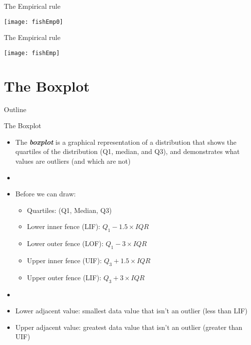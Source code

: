 \documentclass[xcolor=dvipsnames]{beamer}
\begin{document}
\begin{frame}{The Empirical rule}
	\begin{center}
		\texttt{[image: fishEmp0]}
	\end{center}
\end{frame}

\begin{frame}{The Empirical rule}
	\begin{center}
		\texttt{[image: fishEmp]}
	\end{center}
\end{frame}

\section{The Boxplot}
\begin{frame}{Outline}
	\tableofcontents[currentsection,subsectionstyle=show/shaded/hide]
\end{frame}

\begin{frame}{The Boxplot}
	\begin{itemize}
		\item The \textbf{\emph{boxplot}} is a graphical representation of a distribution that shows the quartiles of the distribution (Q1, median, and Q3), and demonstrates what values are outliers (and which are not)
		\item[] 
		\item Before we can draw:
		\begin{itemize}
			\item Quartiles: (Q1, Median, Q3)
			\item Lower inner fence (LIF): $Q_1 - 1.5 \times IQR$
			\item Lower outer fence (LOF): $Q_1 - 3 \times IQR$
			\item Upper inner fence (UIF): $Q_3 + 1.5 \times IQR$
			\item Upper outer fence (LIF): $Q_3 + 3 \times IQR$
		\end{itemize}
	\item[]
	\item Lower adjacent value: smallest data value that isn't an outlier (less than LIF)
	\item Upper adjacent value: greatest data value that isn't an outlier (greater than UIF)
	\end{itemize}
\end{frame}
\end{document}
